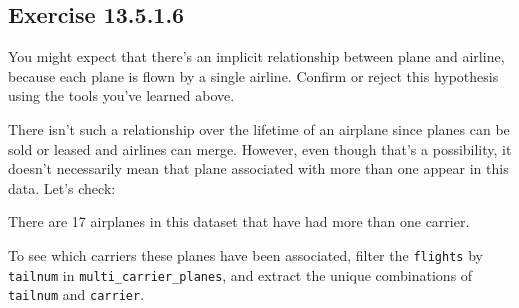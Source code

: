 \documentclass[]{book}
\newenvironment{Shaded}{\begin{snugshade}}{\end{snugshade}}
\newcommand{\CommentTok}[1]{\textcolor[rgb]{0.56,0.35,0.01}{\textit{#1}}}
\newcommand{\DecValTok}[1]{\textcolor[rgb]{0.00,0.00,0.81}{#1}}
\newcommand{\KeywordTok}[1]{\textcolor[rgb]{0.13,0.29,0.53}{\textbf{#1}}}
\newcommand{\NormalTok}[1]{#1}
\newcommand{\OperatorTok}[1]{\textcolor[rgb]{0.81,0.36,0.00}{\textbf{#1}}}
\newcommand{\StringTok}[1]{\textcolor[rgb]{0.31,0.60,0.02}{#1}}
\theoremstyle{plain}
\theoremstyle{remark}
\begin{document}
\hypertarget{exercise-13.5.1.6}{%
\subsection*{\texorpdfstring{Exercise
{13.5.1.6}}{Exercise 13.5.1.6}}\label{exercise-13.5.1.6}}

You might expect that there's an implicit relationship between plane and
airline, because each plane is flown by a single airline. Confirm or
reject this hypothesis using the tools you've learned above.

There isn't such a relationship over the lifetime of an airplane since
planes can be sold or leased and airlines can merge. However, even
though that's a possibility, it doesn't necessarily mean that plane
associated with more than one appear in this data. Let's check:

\begin{Shaded}
\end{Shaded}

There are 17 airplanes in this dataset that have had more than one
carrier.

To see which carriers these planes have been associated, filter the
\texttt{flights} by \texttt{tailnum} in \texttt{multi\_carrier\_planes},
and extract the unique combinations of \texttt{tailnum} and
\texttt{carrier}.
\end{document}
